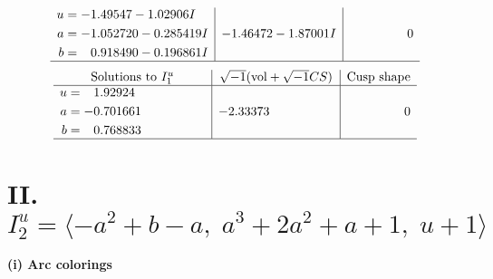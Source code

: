 \documentclass[1p]{elsarticle_modified}
\theoremstyle{definition}
\newcommand{\I}{\sqrt{-1}}
\begin{document}
$$\begin{array}{c|c|c}
\begin{aligned}
u &= -1.49547 - 1.02906 I \\
a &= -1.052720 - 0.285419 I \\
b &= \phantom{-}0.918490 - 0.196861 I\end{aligned}
 & -1.46472 - 1.87001 I & \phantom{-0.000000 } 0\\
 \hline 
 \end{array}$$\newpage$$\begin{array}{c|c|c}  
\text{Solutions to }I^u_{1}& \I (\text{vol} + \sqrt{-1}CS) & \text{Cusp shape}\\
 \hline 
\begin{aligned}
u &= \phantom{-}1.92924\phantom{ +0.000000I} \\
a &= -0.701661\phantom{ +0.000000I} \\
b &= \phantom{-}0.768833\phantom{ +0.000000I}\end{aligned}
 & -2.33373\phantom{ +0.000000I} & \phantom{-0.000000 } 0\\
 \hline 
 \end{array}$$\newpage\newpage\renewcommand{\arraystretch}{1}
\centering \section*{II. $I^u_{2}= \langle - a^2+b- a,\;a^3+2 a^2+a+1,\;u+1 \rangle$}
\flushleft \textbf{(i) Arc colorings}\\
\end{document}
